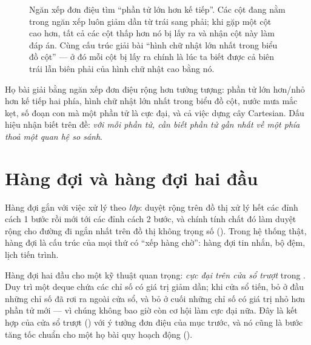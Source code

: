 \documentclass[../../algorithm.tex]{subfiles}
\begin{document}
\begin{figure}[H]\centering
{}
\caption{Ngăn xếp đơn điệu tìm ``phần tử lớn hơn kế tiếp''. Các cột đang nằm trong ngăn xếp luôn giảm dần từ trái sang phải; khi gặp một cột cao hơn, tất cả các cột thấp hơn nó bị lấy ra và nhận cột này làm đáp án. Cùng cấu trúc giải bài ``hình chữ nhật lớn nhất trong biểu đồ cột'' --- ở đó mỗi cột bị lấy ra chính là lúc ta biết được cả biên trái lẫn biên phải của hình chữ nhật cao bằng nó.}
\label{fig:monostack}
\end{figure}

Họ bài giải bằng ngăn xếp đơn điệu rộng hơn tưởng tượng: phần tử lớn hơn/nhỏ hơn kế tiếp hai phía, hình chữ nhật lớn nhất trong biểu đồ cột, nước mưa mắc kẹt, số đoạn con mà một phần tử là cực đại, và cả việc dựng cây Cartesian. Dấu hiệu nhận biết trên đề: \emph{với mỗi phần tử, cần biết phần tử gần nhất về một phía thoả một quan hệ so sánh}.

\section{Hàng đợi và hàng đợi hai đầu}

Hàng đợi gắn với việc xử lý theo \emph{lớp}: duyệt rộng trên đồ thị xử lý hết các đỉnh cách 1 bước rồi mới tới các đỉnh cách 2 bước, và chính tính chất đó làm duyệt rộng cho đường đi ngắn nhất trên đồ thị không trọng số (). Trong hệ thống thật, hàng đợi là cấu trúc của mọi thứ có ``xếp hàng chờ'': hàng đợi tin nhắn, bộ đệm, lịch tiến trình.

Hàng đợi hai đầu cho một kỹ thuật quan trọng: \emph{cực đại trên cửa sổ trượt} trong . Duy trì một deque chứa các chỉ số có giá trị giảm dần; khi cửa sổ tiến, bỏ ở đầu những chỉ số đã rơi ra ngoài cửa sổ, và bỏ ở cuối những chỉ số có giá trị nhỏ hơn phần tử mới --- vì chúng không bao giờ còn cơ hội làm cực đại nữa. Đây là kết hợp của cửa sổ trượt () với ý tưởng đơn điệu của mục trước, và nó cũng là bước tăng tốc chuẩn cho một họ bài quy hoạch động ().
\end{document}
